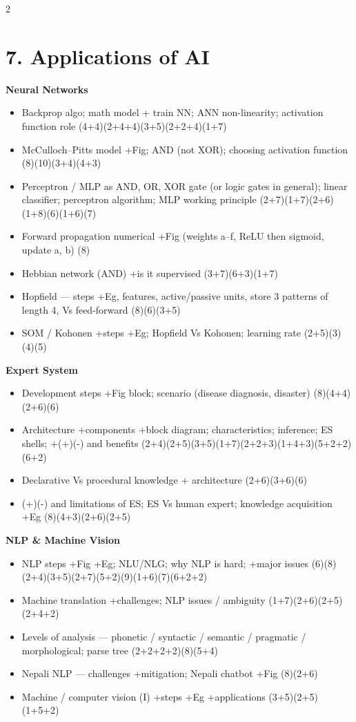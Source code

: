 \documentclass[10pt]{article}
\begin{document}
\begin{multicols}{2}
\section*{7. Applications of AI}
\textbf{Neural Networks}
\begin{itemize}
  \item Backprop algo; math model + train NN; ANN non-linearity; activation function role \hfill (4+4)(2+4+4)(3+5)(2+2+4)(1+7)
  \item McCulloch--Pitts model +Fig; AND (not XOR); choosing activation function \hfill (8)(10)(3+4)(4+3)
  \item Perceptron / MLP as AND, OR, XOR gate (or logic gates in general); linear classifier; perceptron algorithm; MLP working principle \hfill (2+7)(1+7)(2+6)(1+8)(6)(1+6)(7)
  \item Forward propagation numerical +Fig (weights a--f, ReLU then sigmoid, update a, b) \hfill (8)
  \item Hebbian network (AND) +is it supervised \hfill (3+7)(6+3)(1+7)
  \item Hopfield --- steps +Eg, features, active/passive units, store 3 patterns of length 4, Vs feed-forward \hfill (8)(6)(3+5)
  \item SOM / Kohonen +steps +Eg; Hopfield Vs Kohonen; learning rate \hfill (2+5)(3)(4)(5)
\end{itemize}
\textbf{Expert System}
\begin{itemize}
  \item Development steps +Fig block; scenario (disease diagnosis, disaster) \hfill (8)(4+4)(2+6)(6)
  \item Architecture +components +block diagram; characteristics; inference; ES shells; +(+)(-) and benefits \hfill (2+4)(2+5)(3+5)(1+7)(2+2+3)(1+4+3)(5+2+2)(6+2)
  \item Declarative Vs procedural knowledge + architecture \hfill (2+6)(3+6)(6)
  \item (+)(-) and limitations of ES; ES Vs human expert; knowledge acquisition +Eg \hfill (8)(4+3)(2+6)(2+5)
\end{itemize}
\textbf{NLP \& Machine Vision}
\begin{itemize}
  \item NLP steps +Fig +Eg; NLU/NLG; why NLP is hard; +major issues \hfill (6)(8)(2+4)(3+5)(2+7)(5+2)(9)(1+6)(7)(6+2+2)
  \item Machine translation +challenges; NLP issues / ambiguity \hfill (1+7)(2+6)(2+5)(2+4+2)
  \item Levels of analysis --- phonetic / syntactic / semantic / pragmatic / morphological; parse tree \hfill (2+2+2+2)(8)(5+4)
  \item Nepali NLP --- challenges +mitigation; Nepali chatbot +Fig \hfill (8)(2+6)
  \item Machine / computer vision (I) +steps +Eg +applications \hfill (3+5)(2+5)(1+5+2)
\end{itemize}

\end{multicols}
\end{document}
